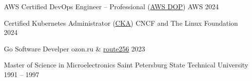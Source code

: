 
\eduEntry
  {AWS Certified DevOps Engineer – Professional (\href{https://www.credly.com/badges/5b2e59d4-7b92-4512-a27f-3766fd520ad6}{AWS DOP})}
  {AWS}
  {2024}

\eduEntry
  {Certified Kubernetes Administrator (\href{https://www.credly.com/badges/35cd73fb-d95d-4f98-b7ce-caa6664475dc}{CKA})}
  {CNCF and The Linux Foundation}
  {2024}

\eduEntry
  {Go Software Develper}
  {ozon.ru \& \href{https://route256.ozon.ru/}{route256}}
  {2023}

\eduEntry
  {Master of Science in Microelectronics}
  {Saint Petersburg State Technical University}
  {1991 -- 1997}
